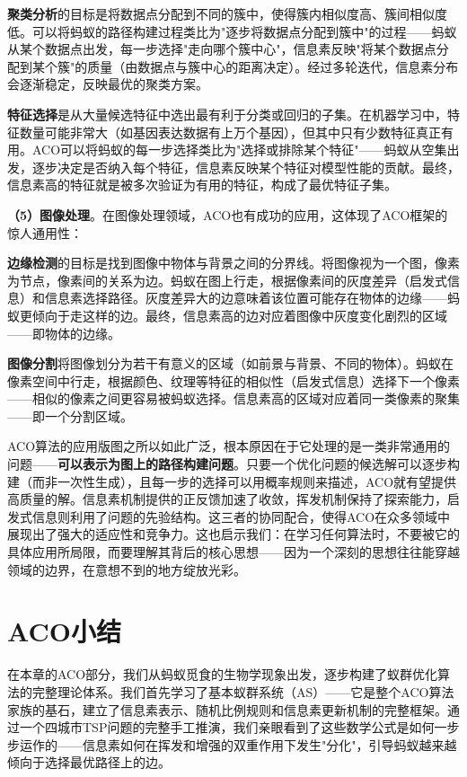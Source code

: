 \documentclass[lang=cn,zihao=-4,a4paper,fontset=windows]{beautybook}
\begin{document}
\textbf{聚类分析}的目标是将数据点分配到不同的簇中，使得簇内相似度高、簇间相似度低。可以将蚂蚁的路径构建过程类比为"逐步将数据点分配到簇中"的过程——蚂蚁从某个数据点出发，每一步选择"走向哪个簇中心"，信息素反映"将某个数据点分配到某个簇"的质量（由数据点与簇中心的距离决定）。经过多轮迭代，信息素分布会逐渐稳定，反映最优的聚类方案。

\textbf{特征选择}是从大量候选特征中选出最有利于分类或回归的子集。在机器学习中，特征数量可能非常大（如基因表达数据有上万个基因），但其中只有少数特征真正有用。ACO可以将蚂蚁的每一步选择类比为"选择或排除某个特征"——蚂蚁从空集出发，逐步决定是否纳入每个特征，信息素反映某个特征对模型性能的贡献。最终，信息素高的特征就是被多次验证为有用的特征，构成了最优特征子集。

\textbf{（5）图像处理}。在图像处理领域，ACO也有成功的应用，这体现了ACO框架的惊人通用性：

\textbf{边缘检测}的目标是找到图像中物体与背景之间的分界线。将图像视为一个图，像素为节点，像素间的关系为边。蚂蚁在图上行走，根据像素间的灰度差异（启发式信息）和信息素选择路径。灰度差异大的边意味着该位置可能存在物体的边缘——蚂蚁更倾向于走这样的边。最终，信息素高的边对应着图像中灰度变化剧烈的区域——即物体的边缘。

\textbf{图像分割}将图像划分为若干有意义的区域（如前景与背景、不同的物体）。蚂蚁在像素空间中行走，根据颜色、纹理等特征的相似性（启发式信息）选择下一个像素——相似的像素之间更容易被蚂蚁选择。信息素高的区域对应着同一类像素的聚集——即一个分割区域。

\begin{fancybox}
ACO算法的应用版图之所以如此广泛，根本原因在于它处理的是一类非常通用的问题——\textbf{可以表示为图上的路径构建问题}。只要一个优化问题的候选解可以逐步构建（而非一次性生成），且每一步的选择可以用概率规则来描述，ACO就有望提供高质量的解。信息素机制提供的正反馈加速了收敛，挥发机制保持了探索能力，启发式信息则利用了问题的先验结构。这三者的协同配合，使得ACO在众多领域中展现出了强大的适应性和竞争力。这也启示我们：在学习任何算法时，不要被它的具体应用所局限，而要理解其背后的核心思想——因为一个深刻的思想往往能穿越领域的边界，在意想不到的地方绽放光彩。
\end{fancybox}

\section*{ACO小结}

在本章的ACO部分，我们从蚂蚁觅食的生物学现象出发，逐步构建了蚁群优化算法的完整理论体系。我们首先学习了基本蚁群系统（AS）——它是整个ACO算法家族的基石，建立了信息素表示、随机比例规则和信息素更新机制的完整框架。通过一个四城市TSP问题的完整手工推演，我们亲眼看到了这些数学公式是如何一步步运作的——信息素如何在挥发和增强的双重作用下发生"分化"，引导蚂蚁越来越倾向于选择最优路径上的边。
\end{document}
